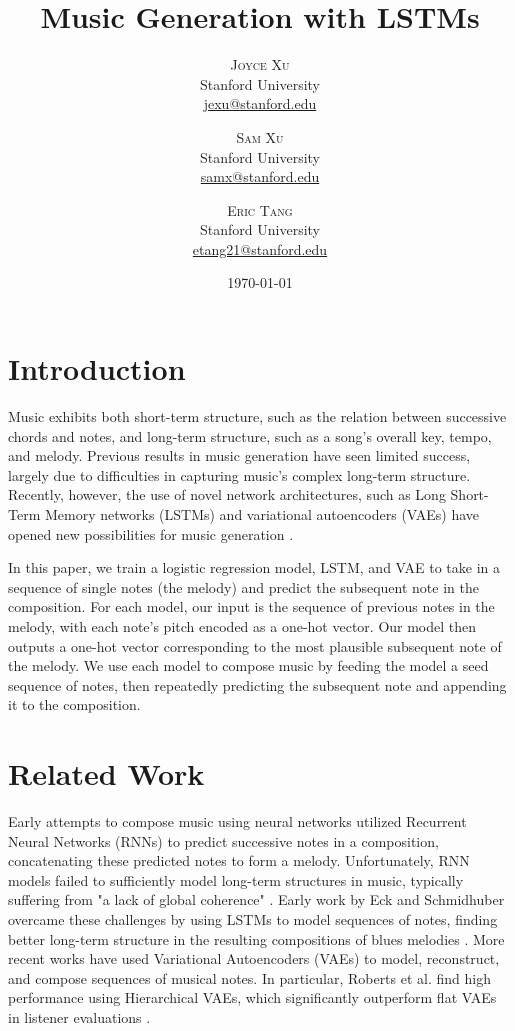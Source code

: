 \documentclass[twoside,twocolumn]{article}
\title{Music Generation with LSTMs} %
\author{%
\textsc{Joyce Xu} \\[1ex] %
\normalsize Stanford University \\ %
\normalsize \href{mailto:jexu@stanford.edu}{jexu@stanford.edu} %
\and %
\textsc{Sam Xu} \\[1ex] %
\normalsize Stanford University \\ %
\normalsize \href{mailto:samx}{samx@stanford.edu} %
\and %
\textsc{Eric Tang} \\[1ex] %
\normalsize Stanford University \\ %
\normalsize \href{mailto:etang21@stanford.edu}{etang21@stanford.edu} %
}
\date{\today} %
\begin{document}
\maketitle


\section{Introduction}

Music exhibits both short-term structure, such as the relation between successive chords and notes, and long-term structure, such as a song's overall key, tempo, and melody. Previous results in music generation have seen limited success, largely due to difficulties in capturing music's complex long-term structure. Recently, however, the use of novel network architectures, such as Long Short-Term Memory networks (LSTMs) and variational autoencoders (VAEs) have opened new possibilities for music generation \cite{lstm-vae}.

In this paper, we train a logistic regression model, LSTM, and VAE to take in a sequence of single notes (the melody) and predict the subsequent note in the composition. For each model, our input is the sequence of previous notes in the melody, with each note's pitch encoded as a one-hot vector. Our model then outputs a one-hot vector corresponding to the most plausible subsequent note of the melody. We use each model to compose music by feeding the model a seed sequence of notes, then repeatedly predicting the subsequent note and appending it to the composition.

\section{Related Work}
Early attempts to compose music using neural networks utilized Recurrent Neural Networks (RNNs) to predict successive notes in a composition, concatenating these predicted notes to form a melody. Unfortunately, RNN models failed to sufficiently model long-term structures in music, typically suffering from "a lack of global coherence" \cite{Mozer}. Early work by Eck and Schmidhuber overcame these challenges by using LSTMs to model sequences of notes, finding better long-term structure in the resulting compositions of blues melodies \cite{eck}. More recent works have used Variational Autoencoders (VAEs) to model, reconstruct, and compose sequences of musical notes. In particular, Roberts et al. find high performance using Hierarchical VAEs, which significantly outperform flat VAEs in listener evaluations \cite{lstm-vae}.
\end{document}
